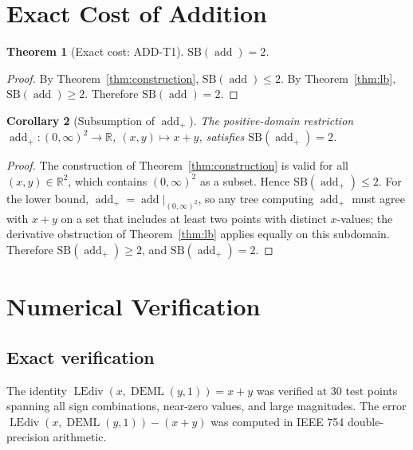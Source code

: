 \documentclass[12pt,a4paper]{article}
\newtheorem{theorem}{Theorem}[section]
\newtheorem{corollary}[theorem]{Corollary}
\theoremstyle{definition}
\newcommand{\DEML}{\operatorname{DEML}}
\newcommand{\LEdiv}{\operatorname{LEdiv}}
\newcommand{\addop}{\operatorname{add}}
\newcommand{\SB}{\mathrm{SB}}
\newcommand{\R}{\mathbb{R}}
\begin{document}
\section{Exact Cost of Addition}
\label{sec:exact}

\begin{theorem}[Exact cost: ADD-T1]
\label{thm:exact}
$\SB(\addop) = 2$.
\end{theorem}

\begin{proof}
By Theorem~\ref{thm:construction}, $\SB(\addop) \le 2$.
By Theorem~\ref{thm:lb}, $\SB(\addop) \ge 2$.
Therefore $\SB(\addop) = 2$.
\end{proof}

\begin{corollary}[Subsumption of $\addop_+$]
\label{cor:addpos}
The positive-domain restriction $\addop_+\colon (0,\infty)^2 \to \R$,
$(x,y) \mapsto x+y$, satisfies $\SB(\addop_+) = 2$.
\end{corollary}

\begin{proof}
The construction of Theorem~\ref{thm:construction} is valid for all
$(x,y) \in \R^2$, which contains $(0,\infty)^2$ as a subset.
Hence $\SB(\addop_+) \le 2$.
For the lower bound, $\addop_+ = \addop|_{(0,\infty)^2}$, so any tree
computing $\addop_+$ must agree with $x + y$ on a set that includes at least
two points with distinct $x$-values; the derivative obstruction of
Theorem~\ref{thm:lb} applies equally on this subdomain.
Therefore $\SB(\addop_+) \ge 2$, and $\SB(\addop_+) = 2$.
\end{proof}

\section{Numerical Verification}
\label{sec:numerical}

\subsection{Exact verification}

The identity $\LEdiv(x, \DEML(y,1)) = x + y$ was verified at 30 test points
spanning all sign combinations, near-zero values, and large magnitudes.
The error $\LEdiv(x, \DEML(y,1)) - (x + y)$ was computed in IEEE 754
double-precision arithmetic.
\end{document}
